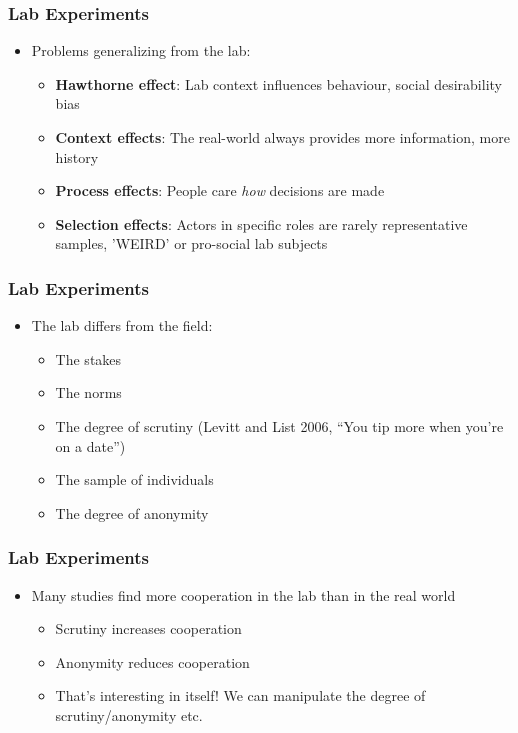 \documentclass[xcolor=x11names,compress]{beamer}\usepackage[]{graphicx}\usepackage[]{color}
\renewcommand{\(}{\begin{columns}}
\renewcommand{\)}{\end{columns}}
\newcommand{\<}[1]{\begin{column}{#1}}
\renewcommand{\>}{\end{column}}
\begin{document}
\begin{frame}
\frametitle{Lab Experiments}
\begin{itemize}
\item Problems generalizing from the lab:
\pause
\begin{itemize}
\item \textbf{Hawthorne effect}: Lab context influences behaviour, social desirability bias
\pause
\item \textbf{Context effects}: The real-world always provides more information, more history
\pause
\item \textbf{Process effects}: People care \textit{how} decisions are made
\pause
\item \textbf{Selection effects}: Actors in specific roles are rarely representative samples, 'WEIRD' or pro-social lab subjects
\end{itemize}
\end{itemize}
\end{frame}

\begin{frame}
\frametitle{Lab Experiments}
\begin{itemize}
\item The lab differs from the field:
\pause
\begin{itemize}
\item The stakes
\item The norms
\item The degree of scrutiny (Levitt and List 2006, ``You tip more when you're on a date'')
\item The sample of individuals
\item The degree of anonymity
\end{itemize}
\end{itemize}
\end{frame}

\begin{frame}
\frametitle{Lab Experiments}
\begin{itemize}
\item Many studies find more cooperation in the lab than in the real world
\pause
\begin{itemize}
\item Scrutiny increases cooperation
\pause
\item Anonymity reduces cooperation
\pause
\item That's interesting in itself! We can manipulate the degree of scrutiny/anonymity etc.
\end{itemize}
\end{itemize}
\end{frame}
\end{document}

